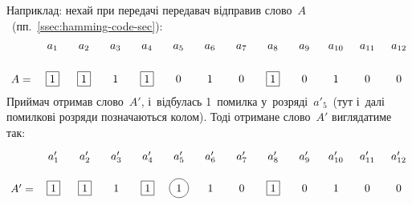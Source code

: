 \documentclass[
	a4paper,
	oneside,
	BCOR = 10mm,
	DIV = 12,
	12pt,
	headings = normal,
]{scrartcl}
\begin{document}
				Наприклад: нехай при передачі передавач відправив слово~$A$~(пп.~\ref{ssec:hamming-code-sec}):
				\[
					\begin{tikzpicture}
						\node[] (A) at (0,0) {$A = $};
						\node[draw, right of = A] (a01) {1};
						\node[draw, right of = a01] (a02) {1};
						\node[right of = a02] (a03) {1};
						\node[draw, right of = a03] (a04) {1};
						\node[right of = a04] (a05) {0};
						\node[right of = a05] (a06) {1};
						\node[right of = a06] (a07) {0};
						\node[draw, right of = a07] (a08) {1};
						\node[right of = a08] (a09) {0};
						\node[right of = a09] (a10) {1};
						\node[right of = a10] (a11) {0};
						\node[right of = a11] (a12) {0};

						\node[above of = a01] (a01_t) {$a_{1}$};
						\node[above of = a02] (a02_t) {$a_{2}$};
						\node[above of = a03] (a03_t) {$a_{3}$};
						\node[above of = a04] (a04_t) {$a_{4}$};
						\node[above of = a05] (a05_t) {$a_{5}$};
						\node[above of = a06] (a06_t) {$a_{6}$};
						\node[above of = a07] (a07_t) {$a_{7}$};
						\node[above of = a08] (a08_t) {$a_{8}$};
						\node[above of = a09] (a09_t) {$a_{9}$};
						\node[above of = a10] (a10_t) {$a_{10}$};
						\node[above of = a11] (a11_t) {$a_{11}$};
						\node[above of = a12] (a12_t) {$a_{12}$};
					\end{tikzpicture}
				\]
				Приймач отримав слово~$A'$, і~відбулась 1~помилка у~розряді~$a'_5$~(тут і~далі помилкові розряди позначаються колом). Тоді отримане слово~$A'$ виглядатиме так:
				\[
					\begin{tikzpicture}
						\node[] (A-prime) at (0,0) {$A' = $};
						\node[draw, right of = A-prime] (a01) {1};
						\node[draw, right of = a01] (a02) {1};
						\node[right of = a02] (a03) {1};
						\node[draw, right of = a03] (a04) {1};
						\node[draw, circle, right of = a04] (a05) {1};
						\node[right of = a05] (a06) {1};
						\node[right of = a06] (a07) {0};
						\node[draw, right of = a07] (a08) {1};
						\node[right of = a08] (a09) {0};
						\node[right of = a09] (a10) {1};
						\node[right of = a10] (a11) {0};
						\node[right of = a11] (a12) {0};

						\node[above of = a01] (a01_t) {$a'_{1}$};
						\node[above of = a02] (a02_t) {$a'_{2}$};
						\node[above of = a03] (a03_t) {$a'_{3}$};
						\node[above of = a04] (a04_t) {$a'_{4}$};
						\node[above of = a05] (a05_t) {$a'_{5}$};
						\node[above of = a06] (a06_t) {$a'_{6}$};
						\node[above of = a07] (a07_t) {$a'_{7}$};
						\node[above of = a08] (a08_t) {$a'_{8}$};
						\node[above of = a09] (a09_t) {$a'_{9}$};
						\node[above of = a10] (a10_t) {$a'_{10}$};
						\node[above of = a11] (a11_t) {$a'_{11}$};
						\node[above of = a12] (a12_t) {$a'_{12}$};
					\end{tikzpicture}
				\]
\end{document}
